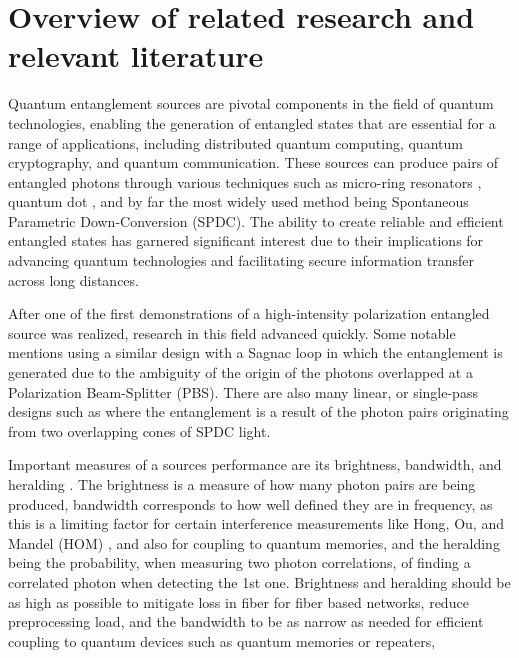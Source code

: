\documentclass{article}
\begin{document}
\section{Overview of related research and relevant literature}
Quantum entanglement sources are pivotal components in the field of quantum technologies, enabling the generation of entangled states
that are essential for a range of applications, including distributed quantum computing, quantum cryptography, and quantum communication.
These sources can produce pairs of entangled photons through various techniques such as micro-ring resonators \cite{Wakabayashi_2015},
quantum dot \cite{Rota_2024}, and by far the most widely used method being Spontaneous Parametric Down-Conversion \cite{jesseSPDC} (SPDC).
The ability to create reliable and efficient entangled states has garnered significant interest due to their
implications for advancing quantum technologies and facilitating secure information transfer across long distances.
\par After one of the first \cite{Kwiat_1995} demonstrations of a high-intensity polarization entangled source was realized,
research in this field advanced quickly. Some notable mentions using a similar design with a Sagnac loop
\cite{Neumann_Buchner_Bulla_Bohmann_Ursin_2022_CW,Chen_Ecker_Wengerowsky_Bulla_Joshi_Steinlechner_Ursin_2018_CW}
in which the entanglement is generated due to the ambiguity of the origin of the photons overlapped at a Polarization Beam-Splitter (PBS).
There are also many linear, or single-pass designs such as \cite{Lee_Kim_Cha_Moon_2016}
where the entanglement is a result of the photon pairs originating from two overlapping cones of SPDC light.
\par Important measures of a sources performance are its brightness, bandwidth, and heralding \cite{Bennink_2010,Ljunggren_Tengner_Marsden_Pelton_2006}.
The brightness is a measure of how many photon pairs are being produced, bandwidth corresponds to how well defined they are in frequency,
as this is a limiting factor for certain interference measurements like
Hong, Ou, and Mandel (HOM) \cite{Hong_Ou_Mandel_1987}, and also for coupling to quantum memories,
and the heralding being the probability, when measuring two photon correlations, of finding a correlated photon when detecting the 1st one.
Brightness and heralding should be as high as possible to mitigate loss in fiber for fiber based networks,
reduce preprocessing load, and the bandwidth to be as narrow as needed for efficient coupling to quantum devices such as quantum memories or repeaters,
\end{document}
